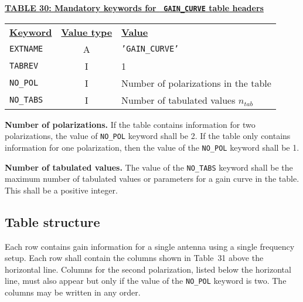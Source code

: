 \documentclass[twoside]{article}
\newcommand{\Hi}[1]{\textcolor{hicol}{#1}}
\newcommand{\ntab}{$n_{tab}$}
\begin{document}
\begin{center}
\underline{\bf{TABLE \Hi{30}: Mandatory keywords for {\tt
    GAIN\_CURVE} table headers}}\\
\begin{tabular}{lcl}
\noalign{\vspace{2pt}}
\underline{{\bf Keyword}} & \underline{\bf{Value type}} &
    \underline{\bf{Value\vphantom{y}}} \\
\noalign{\vspace{2pt}}
{\tt EXTNAME}   & A & {\tt 'GAIN\_CURVE'}  \\
{\tt TABREV}    & I & 1 \\
{\tt NO\_POL}   & I & Number of polarizations in the table \\
{\tt NO\_TABS}  & I & Number of tabulated values \ntab
\end{tabular}
\end{center}

{\bf Number of polarizations.}  If the table contains information for
two polarizations, the value of {\tt NO\_POL} keyword shall be 2.  If
the table only contains information for one polarization, then the
value of the {\tt NO\_POL} keyword shall be 1.

{\bf Number of tabulated values.} The value of the {\tt NO\_TABS}
keyword shall be the maximum number of tabulated values or parameters
for a gain curve in the table.  This shall be a positive \Hi{integer}.

\subsection{Table structure}

Each row contains gain information for a single antenna using a single
frequency setup.  Each row shall contain the columns shown in
Table~\Hi{31 above the horizontal line.  Columns for the second
polarization, listed below the horizontal line, must also appear but
only if the value of the {\tt NO\_POL} keyword is two.}  The columns
may be written in any order.
\end{document}
